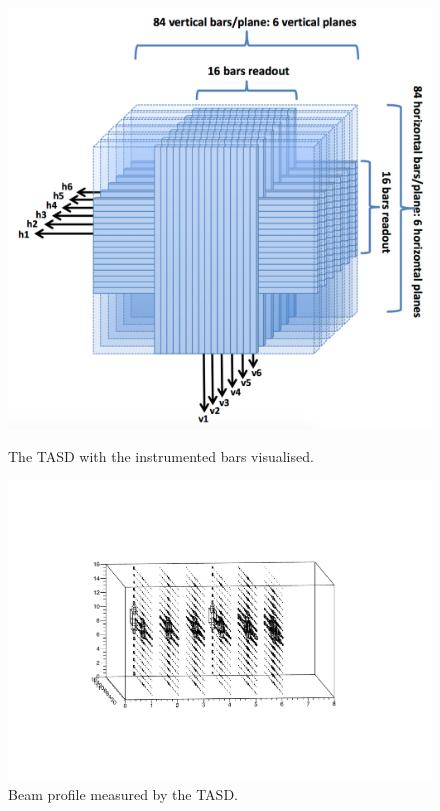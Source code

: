 \begin{figure}[h]
	\begin{minipage}{0.39\linewidth}
		\centerline{\includegraphics[width=0.9\linewidth]{Figures/AIDA.png}}
		\caption[]{The TASD with the instrumented bars visualised.}
		\label{fig:AIDA}
	\end{minipage}
	\hfill
	\begin{minipage}{0.59\linewidth}
		\centerline{\includegraphics[width=\textwidth, trim = 5cm 5cm 5cm 5cm]{Figures/beamPlot.pdf}}
		\caption[]{Beam profile measured by the TASD.}
		\label{fig:beamProfile}
	\end{minipage}
\end{figure}


